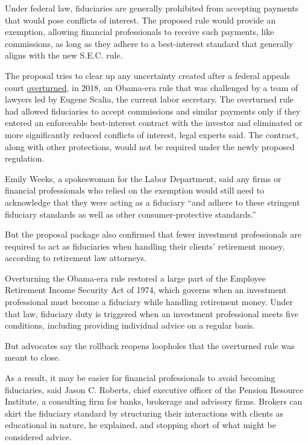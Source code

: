 Under federal law, fiduciaries are generally prohibited from accepting
payments that would pose conflicts of interest. The proposed rule would
provide an exemption, allowing financial professionals to receive such
payments, like commissions, as long as they adhere to a best-interest
standard that generally aligns with the new S.E.C. rule.

The proposal tries to clear up any uncertainty created after a federal
appeals court
\href{https://www.nytimes.com/2018/06/22/your-money/fiduciary-rule-dies.html}{overturned},
in 2018, an Obama-era rule that was challenged by a team of lawyers led
by Eugene Scalia, the current labor secretary. The overturned rule had
allowed fiduciaries to accept commissions and similar payments only if
they entered an enforceable best-interest contract with the investor and
eliminated or more significantly reduced conflicts of interest, legal
experts said. The contract, along with other protections, would not be
required under the newly proposed regulation.

Emily Weeks, a spokeswoman for the Labor Department, said any firms or
financial professionals who relied on the exemption would still need to
acknowledge that they were acting as a fiduciary ``and adhere to these
stringent fiduciary standards as well as other consumer-protective
standards.''

But the proposal package also confirmed that fewer investment
professionals are required to act as fiduciaries when handling their
clients' retirement money, according to retirement law attorneys.

Overturning the Obama-era rule restored a large part of the Employee
Retirement Income Security Act of 1974, which governs when an investment
professional must become a fiduciary while handling retirement money.
Under that law, fiduciary duty is triggered when an investment
professional meets five conditions, including providing individual
advice on a regular basis.

But advocates say the rollback reopens loopholes that the overturned
rule was meant to close.

As a result, it may be easier for financial professionals to avoid
becoming fiduciaries, said Jason C. Roberts, chief executive officer of
the Pension Resource Institute, a consulting firm for banks, brokerage
and advisory firms. Brokers can skirt the fiduciary standard by
structuring their interactions with clients as educational in nature, he
explained, and stopping short of what might be considered advice.

